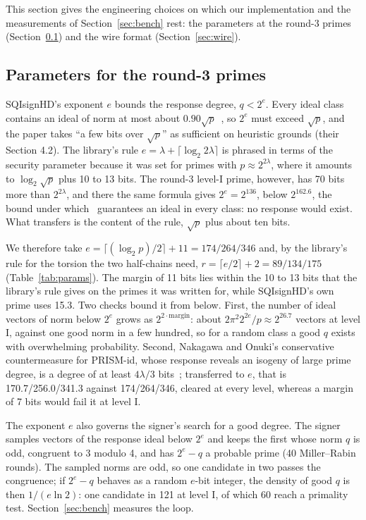 \documentclass[version=preprint]{iacrcc}
\begin{document}
    This section gives the engineering choices on which our implementation
    and the measurements of Section~\ref{sec:bench} rest: the parameters at the
    round-3 primes (Section~\ref{sec:params}) and the wire format
    (Section~\ref{sec:wire}).

    \subsection{Parameters for the round-3 primes}
    \label{sec:params}
    SQIsignHD's exponent $e$ bounds the response degree, $q < 2^e$. Every
    ideal class contains an ideal of norm at most about
    $0.90\sqrt{p}$~\cite[Lemma 12]{DLRW24}, so $2^e$ must exceed $\sqrt{p}$,
    and the paper takes ``a few bits over $\sqrt{p}$'' as sufficient on
    heuristic grounds (their Section 4.2). The library's rule $e = \lambda +
    \lceil \log_2 2\lambda \rceil$ is phrased in terms of the security
    parameter because it was set for primes with $p \approx 2^{2\lambda}$,
    where it amounts to $\log_2 \sqrt{p}$ plus 10 to 13 bits. The round-3
    level-I prime, however, has 70 bits more than $2^{2\lambda}$, and there the
    same formula gives $2^e = 2^{136}$, below $2^{162.6}$, the bound under
    which~\cite[Lemma 12]{DLRW24} guarantees an ideal in every class: no response would exist.
    What transfers is the content of the rule, $\sqrt{p}$ plus about ten bits.

    We therefore take $e = \lceil (\log_2 p)/2 \rceil + 11 = 174/264/346$ and,
    by the library's rule for the torsion the two half-chains need, $r = \lceil
    e/2 \rceil + 2 = 89/134/175$ (Table~\ref{tab:params}). The margin of 11
    bits lies within the 10 to 13 bits that the library's rule gives on the
    primes it was written for, while SQIsignHD's own prime uses 15.3. Two
    checks bound it from below. First, the number of ideal vectors of norm
    below $2^e$ grows as $2^{2 \cdot \mathrm{margin}}$: about $2\pi^2
    2^{2e}/p \approx 2^{26.7}$ vectors at level I, against one good norm in
    a few hundred, so for a random class a good
    $q$ exists with overwhelming probability. Second, Nakagawa and Onuki's conservative
    countermeasure for PRISM-id, whose response reveals an isogeny of large
    prime degree, is a degree of at least $4\lambda/3$ bits~\cite[Section
    5.3]{NO25}; transferred to $e$, that is 170.7/256.0/341.3 against
    174/264/346, cleared at every level, whereas a margin of 7 bits would fail
    it at level I.

    The exponent $e$ also governs the signer's search for a good degree. The
    signer samples vectors of the response ideal below $2^e$ and keeps the
    first whose norm $q$ is odd, congruent to 3 modulo 4, and has $2^e - q$ a
    probable prime (40 Miller--Rabin rounds). The sampled norms are odd, so one
    candidate in two passes the congruence; if $2^e - q$ behaves as a random
    $e$-bit integer, the density of good $q$ is then $1/(e \ln 2)$: one
    candidate in 121 at level I, of which 60 reach a primality test.
    Section~\ref{sec:bench} measures the loop.
\end{document}
